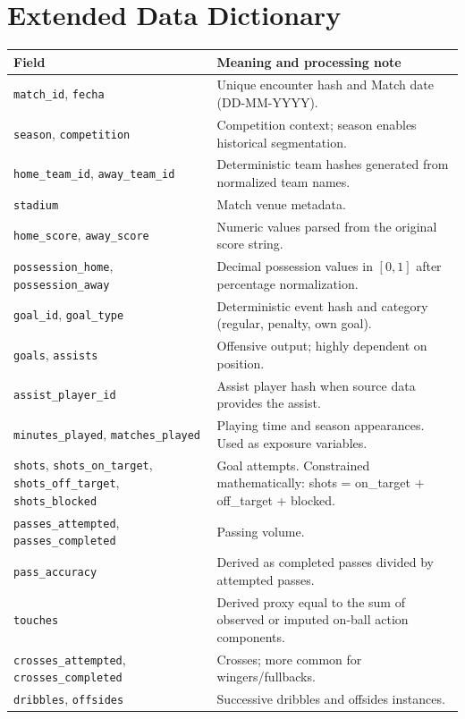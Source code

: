 \documentclass[12pt,a4paper]{article}
\begin{document}
\appendix
\section{Extended Data Dictionary}
\begin{longtable}{p{5.5cm}p{9cm}}
\toprule
\textbf{Field} & \textbf{Meaning and processing note} \\
\midrule
\texttt{match\_id}, \texttt{fecha} & Unique encounter hash and Match date (DD-MM-YYYY). \\
\texttt{season}, \texttt{competition} & Competition context; season enables historical segmentation. \\
\texttt{home\_team\_id}, \texttt{away\_team\_id} & Deterministic team hashes generated from normalized team names. \\
\texttt{stadium} & Match venue metadata. \\
\texttt{home\_score}, \texttt{away\_score} & Numeric values parsed from the original score string. \\
\texttt{possession\_home}, \texttt{possession\_away} & Decimal possession values in $[0,1]$ after percentage normalization. \\
\texttt{goal\_id}, \texttt{goal\_type} & Deterministic event hash and category (regular, penalty, own goal). \\
\texttt{goals}, \texttt{assists} & Offensive output; highly dependent on position. \\
\texttt{assist\_player\_id} & Assist player hash when source data provides the assist. \\
\texttt{minutes\_played}, \texttt{matches\_played} & Playing time and season appearances. Used as exposure variables. \\
\texttt{shots}, \texttt{shots\_on\_target}, \texttt{shots\_off\_target}, \texttt{shots\_blocked} & Goal attempts. Constrained mathematically: shots = on\_target + off\_target + blocked. \\
\texttt{passes\_attempted}, \texttt{passes\_completed} & Passing volume. \\
\texttt{pass\_accuracy} & Derived as completed passes divided by attempted passes. \\
\texttt{touches} & Derived proxy equal to the sum of observed or imputed on-ball action components. \\
\texttt{crosses\_attempted}, \texttt{crosses\_completed} & Crosses; more common for wingers/fullbacks. \\
\texttt{dribbles}, \texttt{offsides} & Successive dribbles and offsides instances. \\

\end{longtable}
\end{document}
